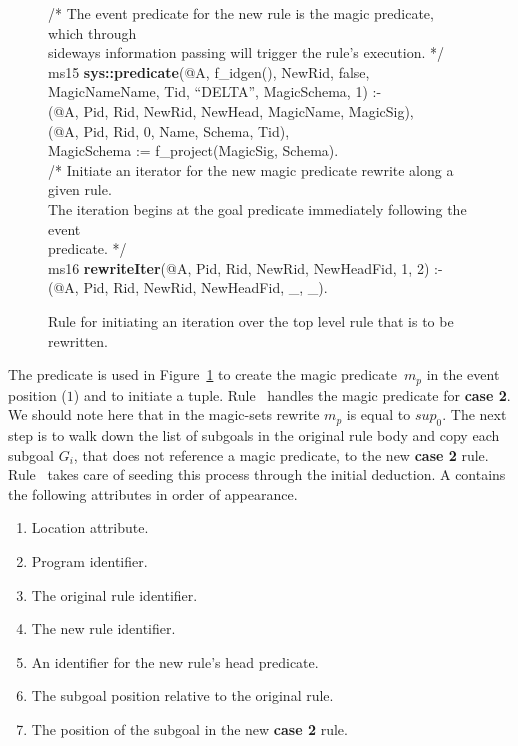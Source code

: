 \begin{figure}[!t]
\ssp
\centering
\begin{boxedminipage}{\linewidth}
/* The event predicate for the new rule is the magic predicate, which through \\
sideways information passing will trigger the rule's execution. */ \\ 
ms15 {\bf sys::predicate}(@A, f\_idgen(), NewRid, false, MagicNameName, Tid, ``DELTA'', MagicSchema, 1) :- \\
(@A, Pid, Rid, NewRid, NewHead, MagicName, MagicSig), \\
(@A, Pid, Rid, 0, Name, Schema, Tid), \\
\datalogspace MagicSchema := f\_project(MagicSig, Schema).\\

/* Initiate an iterator for the new magic predicate rewrite along a given rule.  \\
The iteration begins at the goal predicate immediately following the event \\
predicate. */ \\
ms16 {\bf rewriteIter}(@A, Pid, Rid, NewRid, NewHeadFid, 1, 2) :- \\
(@A, Pid, Rid, NewRid, NewHeadFid, \_, \_). \\

\end{boxedminipage}
\caption{\label{ch:magic:fig:rewrite2} Rule for initiating an iteration over the
top level rule that is to be rewritten. }
\end{figure}

The  predicate is used in Figure~\ref{ch:magic:fig:rewrite2} to
create the magic predicate~$m_p$ in the event position ($1$) and to initiate a
 tuple.  Rule~ handles the magic predicate for {\bf
case 2}.  We should note here that in the magic-sets rewrite $m_p$ is equal to
$sup_0$.  The next step is to walk down the list of subgoals in the original
rule body and copy each subgoal $G_{i}$, that does not reference a magic
predicate, to the new {\bf case 2} rule.  Rule~ takes care of seeding this process
through the initial  deduction.  A  contains
the following attributes in order of appearance.
\begin{enumerate} 
  \ssp
  \item Location attribute.  
  \item Program identifier.
  \item The original rule identifier.
  \item The new rule identifier.
  \item An identifier for the new rule's head predicate.
  \item The subgoal position relative to the original rule.
  \item The position of the subgoal in the new {\bf case 2} rule.
\end{enumerate}

